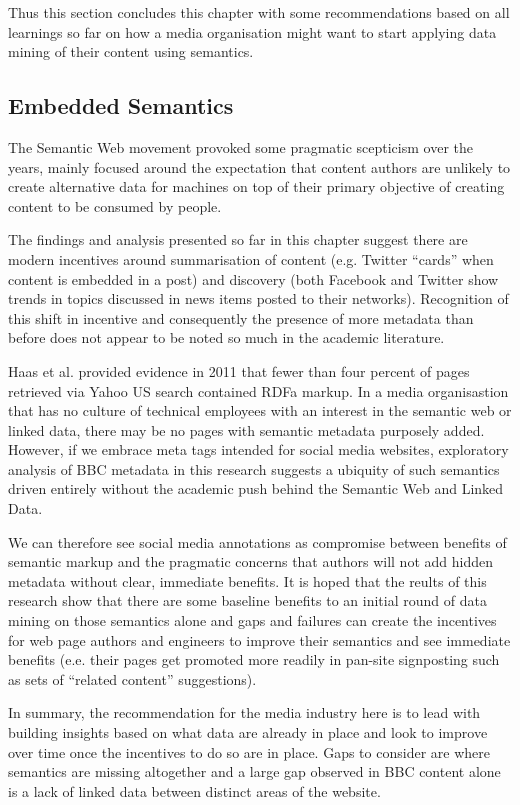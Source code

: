 Thus this section concludes this chapter with some recommendations
based on all learnings so far on how a media organisation might
want to start applying data mining of their content using semantics.

\subsection{Embedded Semantics}

The Semantic Web movement provoked some pragmatic
scepticism\cite{marshall2003semantic} over the years, mainly focused
around the expectation that content authors are unlikely to create
alternative data for machines on top of their primary objective of
creating content to be consumed by people.

The findings and analysis presented so far in this chapter suggest
there are modern incentives around summarisation of content
(e.g. Twitter ``cards'' when content is embedded in a post) and
discovery (both Facebook and Twitter show trends in topics discussed
in news items posted to their networks). Recognition of this shift
in incentive and consequently the presence of more metadata than
before does not appear to be noted so much in the academic literature.

Haas et al.\cite{haas2011enhanced} provided evidence in 2011 that
fewer than four percent of pages retrieved via Yahoo US search
contained RDFa markup. In a media organisastion that has no culture
of technical employees with an interest in the semantic web or
linked data, there may be no pages with semantic metadata purposely
added. However, if we embrace meta tags intended for social media
websites, exploratory analysis of BBC metadata in this research
suggests a ubiquity of such semantics driven entirely without the
academic push behind the Semantic Web and Linked Data.

We can therefore see social media annotations as compromise between
benefits of semantic markup and the pragmatic concerns that authors
will not add hidden metadata without clear, immediate benefits. It is
hoped that the reults of this research show that there are some
baseline benefits to an initial round of data mining on those
semantics alone and gaps and failures can create the incentives for
web page authors and engineers to improve their semantics and see
immediate benefits (e.e. their pages get promoted more readily in
pan-site signposting such as sets of ``related content'' suggestions).

In summary, the recommendation for the media industry here is to lead
with building insights based on what data are already in place and
look to improve over time once the incentives to do so are in place.
Gaps to consider are where semantics are missing altogether and a
large gap observed in BBC content alone is a lack of linked data
between distinct areas of the website.

